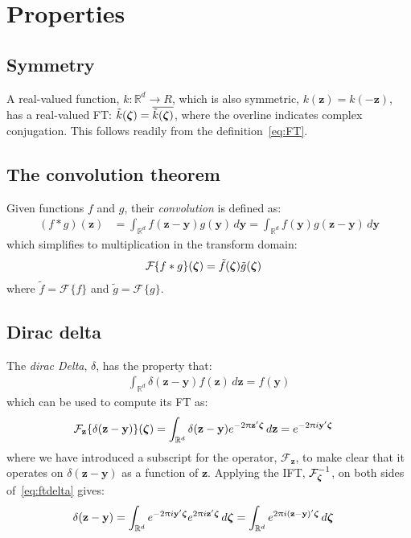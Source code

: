\documentclass[a4paper,oneside,12pt,english]{report}
\def\zvec{\mathbf{z}}
\def\R{\mathbb{R}}
\def\yvec{\mathbf{y}}
\def\funcdef#1#2#3{#1:#2\to#3}
\def\Fset{\mathcal{F}}
\newcommand\FT[2][]{\Fset_{#1}\{#2\}}
\def\conj#1{\overline{#1}}
\begin{document}
\section{Properties}

\subsection{Symmetry}
A real-valued function, $\funcdef{k}{\R^d}{R}$, which is also symmetric, $k(\zvec)=k(-\zvec)$, has a real-valued FT: $\tilde k(\zetavec) = \conj{\tilde k(\zetavec)}$, where the overline indicates complex conjugation. This follows readily from the definition~\eqref{eq:FT}.

\subsection{The convolution theorem}
Given functions $f$ and $g$, their \emph{convolution} is defined as:
\begin{align}
(f\ast g)(\zvec) &= \int_{\R^d} f(\zvec-\yvec)g(\yvec)\,d\yvec
= \int_{\R^d} f(\yvec)g(\zvec-\yvec)\,d\yvec
\end{align}
which simplifies to multiplication in the transform domain:
\begin{align}
\FT{f\ast g}(\zetavec) &= \tilde f(\zetavec)\tilde g(\zetavec)
\end{align}
where $\tilde f=\FT{f}$ and $\tilde g=\FT{g}$.


\subsection{Dirac delta}
The \emph{dirac Delta}, $\delta$, has the property that:
\begin{align}
\label{eq:delta}
\int_{\R^d} \delta(\zvec-\yvec) f(\zvec) \,d\zvec = f(\yvec) 
\end{align}
which can be used to compute its FT as:
\begin{align}
\label{eq:ftdelta}
\FT[\zvec]{\delta(\zvec-\yvec)}(\zetavec) &= \int_{\R^d} \delta(\zvec-\yvec)e^{-2\uppi\zvec'\zetavec}\,d\zvec
= e^{-2\uppi i\yvec'\zetavec}
\end{align}
where we have introduced a subscript for the operator, $\Fset_\zvec$, to make clear that it operates on $\delta(\zvec-\yvec)$ as a function of $\zvec$. Applying the IFT, $\Fset_{\zetavec}^{-1}$, on both sides of~\eqref{eq:ftdelta} gives:
\begin{align}
\label{eq:iftdelta}
\delta(\zvec-\yvec) &= \int_{\R^d} e^{-2\uppi i\yvec'\zetavec} e^{2\uppi i \zvec'\zetavec} \,d\zetavec
= \int_{\R^d} e^{2\uppi i(\zvec-\yvec)'\zetavec} \,d\zetavec
\end{align}
\end{document}
